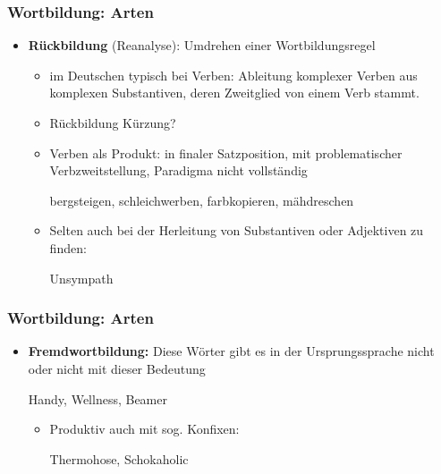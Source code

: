 \begin{frame}
\frametitle{Wortbildung: Arten}

\begin{itemize}
\item \textbf{Rückbildung} (Reanalyse): Umdrehen einer Wortbildungsregel

\begin{itemize}
\item im Deutschen typisch bei Verben: Ableitung komplexer Verben aus komplexen Substantiven, deren Zweitglied von einem Verb stammt.
\item Rückbildung \ras Kürzung?
\item Verben als Produkt: in finaler Satzposition, mit problematischer Verbzweitstellung, Paradigma nicht vollständig

\ea bergsteigen, schleichwerben, farbkopieren, mähdreschen
\z

\item Selten auch bei der Herleitung von Substantiven oder Adjektiven zu finden:

\ea Unsympath
\z

\end{itemize}
\end{itemize}


\end{frame}


\begin{frame}
\frametitle{Wortbildung: Arten}

\begin{itemize}
\item \textbf{Fremdwortbildung:} Diese Wörter gibt es in der Ursprungssprache nicht oder nicht mit dieser Bedeutung

\ea Handy, Wellness, Beamer
\z

\begin{itemize}
\item Produktiv auch mit sog. Konfixen:

\ea Thermohose, Schokaholic
\z

\end{itemize}

\end{itemize}


\end{frame}


